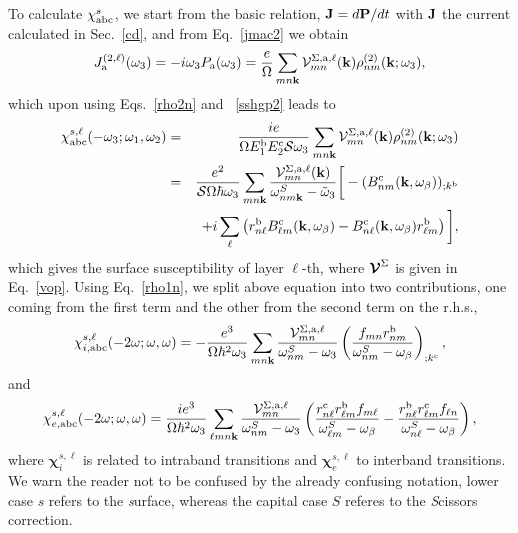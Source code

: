 \documentclass{article}
\begin{document}
To calculate $\chi_{\mathrm{a}\mathrm{b}\mathrm{c}}^s$,
we start from the basic relation, $\mathbf{J}=d\mathbf{P}/dt$ 
with $\mathbf{J}$ the current calculated in Sec.~\ref{cd}, and
from Eq.~\eqref{jmac2} we obtain
\begin{equation}\label{Pjikn}
J_{\mathrm{a}}^{(2,\ell)}(\omega_3)=-i\omega_3P_{\mathrm{a}}(\omega_3)
=\frac{e}{\Omega}
\sum_{mn\mathbf{k}}
{\mathbf{\cal V}}^{\Sigma,\mathrm{a},\ell}_{mn}(\mathbf{k})
\rho^{(2)}_{nm}(\mathbf{k};\omega_3)
,
\end{equation}
which upon using Eqs.~\eqref{rho2n} and ~\eqref{sshgp2} leads to
\begin{eqnarray}\label{Pjikn2}
\chi^{s,\ell}_{\mathrm{a}\mathrm{b}\mathrm{c}}(-\omega_3;\omega_1,\omega_2)
&=&
\frac{ie}{\Omega E^{\mathrm{b}}_1E^{\mathrm{c}}_2{\cal S} \omega_3}
\sum_{mn\mathbf{k}}
{\mathbf{\cal V}}^{\Sigma,\mathrm{a},\ell}_{mn}(\mathbf{k})
\rho^{(2)}_{nm}(\mathbf{k};\omega_3)
\nonumber \\
&=&
\frac{e^2}{{\cal S}\Omega\hbar\omega_3}
\sum_{mn\mathbf{k}}
\frac{{\mathbf{\cal V}}^{\Sigma,\mathrm{a},\ell}_{mn}(\mathbf{k})}
{\omega^S_{nm\mathbf{k}}-\tilde\omega_3}
\bigg[
-(B_{nm}^{\mathrm{c}}(\mathbf{k},\omega_\beta))_{;k^{\mathrm{b}}}
\nonumber \\
&&
+i\sum_\ell\left(r_{n\ell}^{\mathrm{b}}B_{\ell m}^{\mathrm{c}}(\mathbf{k},\omega_\beta) -
  B_{n\ell}^{\mathrm{c}}(\mathbf{k},\omega_\beta) 
  r_{\ell m}^{\mathrm{b}}\right)
\bigg]
,
\end{eqnarray}
which gives the surface susceptibility of layer $\ell$-th, where 
$\boldsymbol{\mathcal{\cal V}}^\Sigma$ is given in Eq.~\eqref{vop}.
Using Eq.~\eqref{rho1n}, we
split above equation into
two contributions, one coming from the first term and the other
from the second term on the r.h.s.,
\begin{equation}\label{chii}
\chi_{i,\mathrm{a}\mathrm{b}\mathrm{c}}^{s,\ell}
(-2\omega;\omega,\omega)
=-\frac{e^3}{\Omega\hbar^2\omega_3}\sum_{mn\mathbf{k}}
\frac{{\mathbf{\cal V}}_{mn}^{\Sigma,\mathrm{a},\ell}}{\omega^S_{nm}-\omega_3}
\left(\frac{f_{mn}r_{nm}^{\mathrm{b}}}{\omega^S_{nm}-\omega_\beta}\right)_{;k^{\mathrm{c}}},
\end{equation} 
and
\begin{equation}\label{chie}
\chi_{e,\mathrm{a}\mathrm{b}\mathrm{c}}^{s,\ell}
(-2\omega;\omega,\omega)
=\frac{ie^3}{\Omega\hbar^2\omega_3}\sum_{\ell mn\mathbf{k}}
\frac{{\mathbf{\cal V}}_{mn}^{\Sigma,\mathrm{a},\ell}}{\omega^S_{nm}-\omega_3}
\left(
\frac{r_{n\ell}^{\mathrm{c}} r_{\ell m}^{\mathrm{b}} 
f_{m\ell}}{\omega^S_{\ell m}-\omega_\beta}
-\frac{r_{n\ell}^{\mathrm{b}} r_{\ell m}^{\mathrm{c}} 
f_{\ell n}}{\omega^S_{n \ell}-\omega_\beta}
\right),
\end{equation} 
where $\boldsymbol{\chi}^{s,\ell}_i$
 is related to intraband transitions and
$\boldsymbol{\chi}^{s,\ell}_e$
to interband transitions. We warn the reader not to be confused by the
already confusing notation, lower case $s$ refers to the 
{\it s}urface, whereas the capital case $S$ referes to the {\it S}cissors correction.   
\end{document}
